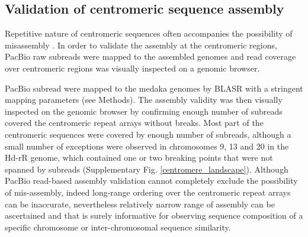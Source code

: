 

\subsection*{Validation of centromeric sequence assembly}
  Repetitive nature of centromeric sequences often accompanies the possibility of misassembly \cite{}. In order to validate the assembly at the centromeric regions, PacBio raw subreads were mapped to the assembled genomes and read coverage over centromeric regions was visually inspected on a genomic browser.


  PacBio subread were mapped to the medaka genomes by BLASR \cite{} with a stringent mapping parameters (see Methods). The assembly validity was then visually inspected on the genomic browser by confirming enough number of subreads covered the centromeric repeat arrays without breaks. Most part of the centromeric sequences were covered by enough number of subreads, although a small number of exceptions were observed in chromosomes 9, 13 and 20 in the Hd-rR genome, which contained one or two breaking points that were not spanned by subreads (Supplementary Fig. \ref{centromere_landscape}). Although PacBio read-based assembly validation cannot completely exclude the possibility of mis-assembly, indeed long-range ordering over the centromeric repeat arrays can be inaccurate, nevertheless relatively narrow range of assembly can be ascertained and that is surely informative for observing sequence composition of a specific chromosome or inter-chromosomal sequence similarity.


